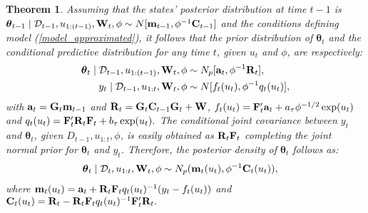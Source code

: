 \documentclass[12pt,a4paper]{article}\usepackage[]{graphicx}\usepackage[]{color}\usepackage{subfigure}
\newtheorem{myth}{Theorem}[section]
\newcommand{\bftheta}{\boldsymbol{\theta}}
\newcommand{\mathD}{\mathcal{D}}
\begin{document}
\begin{myth}\label{Teo2}
Assuming that the states' posterior distribution at time $t-1$ is 
$\bftheta_{t-1}\mid  \mathD_{t-1}, u_{1:(t-1)},{\bf W}_t, \phi\sim N[{\bf m}_{t-1},\phi^{-1}{\bf C}_{t-1}]$ and the conditions defining model 
(\ref{model_approximated}), it follows  that the prior distribution of $\bftheta_{t}$ and the conditional predictive distribution for any time 
$t$, given $u_t$ and $\phi$, are respectively:
 \begin{align}
  \bftheta_{t}\mid \mathD_{t-1}, u_{1:(t-1)},{\bf W}_t, \phi &\sim N_p[{\bf a}_{t},\phi^{-1}{\bf R}_{t}],\nonumber\\
  y_t\mid \mathD_{t-1}, u_{1:t},{\bf W}_t,\phi &\sim N[f_t(u_t), \phi^{-1}q_t(u_t)],\label{forec_cond_u}
  \end{align}
  with ${\bf a}_t={\bf G}_t{\bf m}_{t-1}$ and ${\bf R}_t={\bf G}_t{\bf C}_{t-1}{\bf G}_t+ {\bf W}$, 
  $f_t(u_t)={\bf F}_t'{\bf a}_{t}+a_{\tau}\phi^{-1/2}\exp(u_t)$ and $q_t(u_t)={\bf F}_t'{\bf R}_{t} {\bf F}_t + b_{\tau}\exp(u_t).$
The  conditional joint covariance between  $y_t$ and $\bftheta_t$,  given $D_{t-1}, u_{1:t}, \phi$, is easily obtained as  ${\bf R}_t {\bf F}_t$ completing the joint normal prior for $\bftheta_t$ and $y_t$. 
Therefore, the posterior density of  $ \bftheta_t$   follows as:
\begin{align}\label{post_thet_condU}
 \bftheta_{t}\mid \mathD_{t},u_{1:t},{\bf W}_t,\phi &\sim N_p({\bf m}_{t}(u_t),\phi^{-1}{\bf C}_{t}(u_t)),
  \end{align}
 where $ {\bf m}_{t}(u_t)={\bf a}_t+{\bf R}_t{\bf F}_tq_t(u_t)^{-1}(y_t-f_t(u_t))$ and ${\bf C}_t(u_t) = {\bf R}_t - {\bf R}_t {\bf F}_t q_t(u_t)^{-1} {\bf F}_t' {\bf R}_t.$
 \end{myth}
\end{document}

